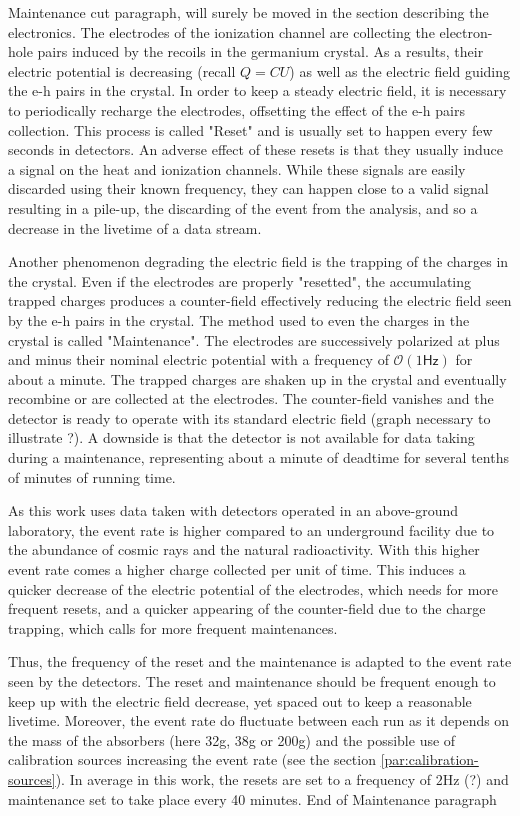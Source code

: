 {\color{red} Maintenance cut paragraph, will surely be moved in the section describing the electronics.}
\label{par:reset-maintenance}
The electrodes of the ionization channel are collecting the electron-hole pairs induced by the recoils in the germanium crystal. As a results, their electric potential is decreasing (recall $Q=CU$) as well as the electric field guiding the e-h pairs in the crystal. In order to keep a steady electric field, it is necessary to periodically recharge the electrodes, offsetting the effect of the e-h pairs collection. This process is called "Reset" and is usually set to happen every few seconds in detectors.
An adverse effect of these resets is that they usually induce a signal on the heat and ionization channels. While these signals are easily discarded using their known frequency, they can happen close to a valid signal resulting in a pile-up, the discarding of the event from the analysis, and so a decrease in the livetime of a data stream.

Another phenomenon degrading the electric field is the trapping of the charges in the crystal. Even if the electrodes are properly "resetted", the accumulating trapped charges produces a counter-field effectively reducing the electric field seen by the e-h pairs in the crystal. The method used to even the charges in the crystal is called "Maintenance". The electrodes are successively polarized at plus and minus their nominal electric potential with a frequency of $\mathcal{O}(1\textsf{Hz})$ for about a minute. The trapped charges are shaken up in the crystal and eventually recombine or are collected at the electrodes. The counter-field vanishes and the detector is ready to operate with its standard electric field (graph necessary to illustrate ?). A downside is that the detector is not available for data taking during a maintenance, representing about a minute of deadtime for several tenths of minutes of running time. 

As this work uses data taken with detectors operated in an above-ground laboratory, the event rate is higher compared to an underground facility due to the abundance of cosmic rays and the natural radioactivity.
With this higher event rate  comes a higher charge collected per unit of time. This induces a quicker decrease of the electric potential of the electrodes, which needs for more frequent resets, and a quicker appearing of the counter-field due to the charge trapping, which calls for more frequent maintenances.

Thus, the frequency of the reset and the maintenance is adapted to the event rate seen by the detectors. The reset and maintenance should be frequent enough to keep up with the electric field decrease, yet spaced out to keep a reasonable livetime. Moreover, the event rate do fluctuate between each run as it depends on the mass of the absorbers (here 32g, 38g or 200g) and the possible use of calibration sources increasing the event rate (see the section \ref{par:calibration-sources}).
In average in this work, the resets are set to a frequency of $2$Hz (?) and maintenance set to take place every 40 minutes.
{\color{red} End of Maintenance paragraph}

